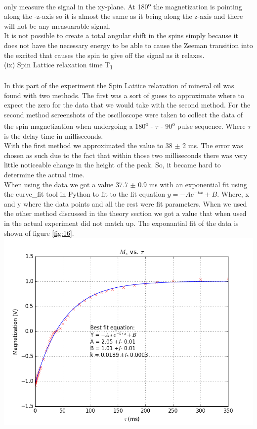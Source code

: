 \documentclass{article}
\begin{document}
{\begin{multicols}{2}
only measure the signal in the xy-plane. At 180\textsuperscript{o} the 
magnetization is pointing along the -z-axis so it is almost the same as it 
being along the z-axis and there will not be any measuarable signal.
\\
It is not possible to create a total angular shift in the spins simply because 
it does not have the necessary energy to be able to cause the Zeeman transition into the excited that causes the spin to give off the signal as it relaxes.
\\
(ix) Spin Lattice relaxation time T\textsubscript{1} \\
\\
In this part of the experiment the Spin Lattice relaxation of mineral oil was 
found with two methods. The first was a sort of guess to approximate where to 
expect the zero for the data that we would take with the second method. For the 
second method screenshots of the oscilloscope were taken to collect the data of 
the spin magnetization when undergoing a 180\textsuperscript{o} - $\tau$ - 
90\textsuperscript{o} pulse sequence. Where $\tau$ is the delay time in 
milliseconds.
\\
With the first method we approximated the value to 38 $\pm$ 2 ms. The error was 
chosen as such due to the fact that within those two milliseconds there was 
very little noticeable change in the height of the peak. So, it became hard to 
determine the actual time.
\\
When using the data we got a value 37.7 $\pm$ 0.9 ms with an exponential fit 
using the curve\_fit tool in Python to fit to the fit equation 
$y = -Ae^{-kx} + B$. Where, x and y where the data points and all the rest were 
fit parameters. When we used the other method discussed in the theory section 
we got a value that when used in the actual experiment did not match up. The 
exponantial fit of the data is shown of figure \ref{fig:16}.
\center
\includegraphics[width=\linewidth]{pic-for-report/mineral-water-T1.png}

\end{multicols}}
\end{document}
